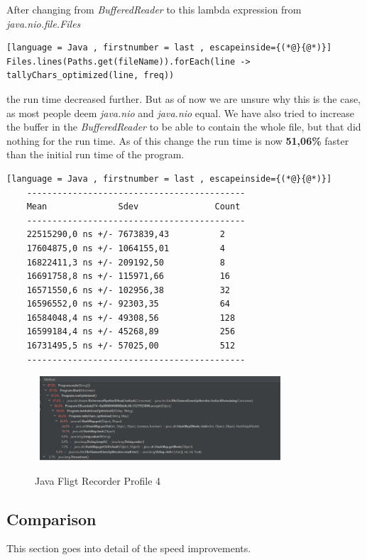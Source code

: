 After changing from \emph{BufferedReader} to this lambda expression from \emph{java.nio.file.Files} \begin{lstlisting}[language = Java , firstnumber = last , escapeinside={(*@}{@*)}]
Files.lines(Paths.get(fileName)).forEach(line -> tallyChars_optimized(line, freq))
\end{lstlisting} the run time decreased further. But as of now we are unsure why this is the case, as most people deem \emph{java.nio} and \emph{java.nio} equal. We have also tried to increase the buffer in the \emph{BufferedReader} to be able to contain the whole file, but that did nothing for the run time. As of this change the run time is now \textbf{51,06\%} faster than the initial run time of the program.

\begin{lstlisting}[language = Java , firstnumber = last , escapeinside={(*@}{@*)}]
    -------------------------------------------
    Mean              Sdev               Count
    -------------------------------------------
    22515290,0 ns +/- 7673839,43          2
    17604875,0 ns +/- 1064155,01          4
    16822411,3 ns +/- 209192,50           8
    16691758,8 ns +/- 115971,66           16
    16571550,6 ns +/- 102956,38           32
    16596552,0 ns +/- 92303,35            64
    16584048,4 ns +/- 49308,56            128
    16599184,4 ns +/- 45268,89            256
    16731495,5 ns +/- 57025,00            512
    -------------------------------------------
\end{lstlisting}

\begin{figure}[H]
    \centering\
    \includegraphics[width = 0.8\textwidth ]{figures/profile4.PNG}
    \caption{Java Fligt Recorder Profile 4}
    \label{fig:p4}
\end{figure}

\subsection{Comparison}
This section goes into detail of the speed improvements.


